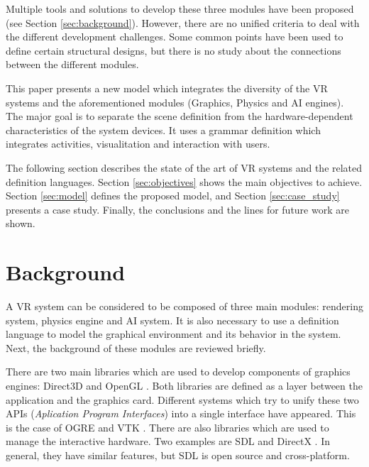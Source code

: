 Multiple tools and solutions to develop these three modules have been proposed (see Section
\ref{sec:background}). However, there are no unified criteria to deal with the different
development challenges. Some common points have been used to define certain structural designs, but
there is no study about the connections between the different modules.

This paper presents a new model which integrates the diversity of the VR systems and the
aforementioned modules (Graphics, Physics and AI engines). The major goal is to
separate the scene definition from the hardware-dependent characteristics of the system devices. It
uses a grammar definition which integrates activities, visualitation and interaction with users.

The following section describes the state of the art of VR systems and the related definition
languages. Section \ref{sec:objectives} shows the main objectives to achieve. Section
\ref{sec:model} defines the proposed model, and Section \ref{sec:case_study} presents a case study.
Finally, the conclusions and the lines for future work are shown.



\section{Background
\label{sec:background}}

A VR system can be considered to be composed of three main modules: rendering system, physics
engine and AI system. It is also necessary to use a definition language to model the graphical
environment and its behavior in the system. Next, the background of these modules are reviewed
briefly.

There are two main libraries which are used to develop components of graphics engines: Direct3D
\cite{DirectX} and OpenGL \cite{OpenGL}. Both libraries are defined as a layer between the
application and the graphics card. Different systems which try to unify these two APIs
(\textit{Aplication Program Interfaces}) into a single interface have appeared. This is the case of
OGRE \cite{OGRE} and VTK \cite{VTK}. There are also libraries which are used to manage the
interactive hardware. Two examples are SDL \cite{SDL} and DirectX \cite{DirectX}. In general, they
have similar features, but SDL is open source and cross-platform.

